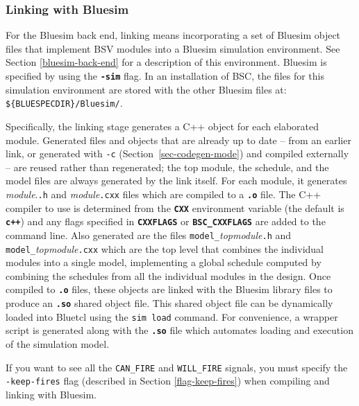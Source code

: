 \documentclass{article}
\newcommand{\te}[1]{\texttt{#1}}
\begin{document}


\subsubsection{Linking with Bluesim}

For the Bluesim back end, linking means incorporating a set of Bluesim object
files that implement BSV modules into a Bluesim simulation
environment.  See Section \ref{bluesim-back-end} for a description of this
environment.  Bluesim is specified by using the {\bf\tt -sim} flag.
In an installation of BSC, the files for
this simulation environment are stored with the other Bluesim files
at: \verb|${BLUESPECDIR}/Bluesim/|.

Specifically, the linking stage generates a C++ object for each
elaborated module.  Generated files and objects that are already up to
date -- from an earlier link, or generated with \te{-c}
(Section~\ref{sec-codegen-mode}) and compiled externally -- are reused
rather than regenerated; the top module, the schedule, and the model
files are always generated by the link itself.  For each module, it generates {\em module}.\te{.h} and
{\em module}\te{.cxx} files which are compiled to a {\bf\tt .o} file.
The C++ compiler to use is determined from the {\bf\tt CXX}
environment variable (the default is {\bf\tt c++}) and any flags
specified in {\bf\tt CXXFLAGS} or {\bf\tt BSC\_CXXFLAGS} are added to
the command line.
Also generated are the files \te{model\_}{\em topmodule}\te{.h} and
\te{model\_}{\em topmodule}\te{.cxx} which are the top level that combines
the individual modules into a single model,
implementing a global schedule computed by combining the schedules from
all the individual modules in the design.
Once compiled to {\bf\tt .o} files, these objects are linked with
the Bluesim library files to produce an {\bf\tt .so} shared object
file.  This shared object file can be dynamically loaded into Bluetcl
using the {\tt sim load} command.  For convenience, a wrapper script
is generated along with the {\bf\tt .so} file which automates loading
and execution of the simulation model.

If you want to see all the \te{CAN\_FIRE} and \te{WILL\_FIRE} signals,
you must specify the \te{-keep-fires} flag (described in Section
\ref{flag-keep-fires})  when compiling and linking
with Bluesim.
\end{document}
